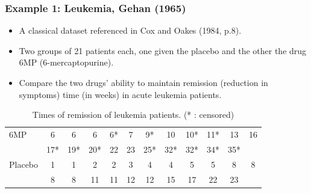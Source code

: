 \documentclass{beamer}
\newenvironment{wideitemize}%
  {\begin{itemize}%
    \setlength{\parskip}{1em}}%
  {\end{itemize}}
\begin{document}
\begin{frame} \frametitle{Example 1: Leukemia, Gehan (1965)}


  
  \begin{wideitemize}
  \item A classical dataset referenced in Cox and Oakes (1984, p.8).
  
  \item Two groups of 21 patients each, one given
  the placebo and the other the drug 6MP (6-mercaptopurine).
  
  \item Compare the two drugs' ability to maintain
  remission (reduction in symptoms) time (in weeks) in acute leukemia patients.
  
  \end{wideitemize}

\begin{scriptsize}
\begin{table}
\begin{center}
\caption{Times of remission of leukemia patients. (* : censored)} \vspace{0.15cm}
  \begin{tabular}{l*{11}{c}} 6MP & 6 & 6 & 6 & 6* & 7 & 9* & 10 & 10*
    & 11* & 13 & 16\\ & 17* & 19* & 20* & 22 & 23 & 25* & 32* & 32* &
    34* & 35*\\ Placebo & 1 & 1 & 2 & 2 & 3 & 4 & 4 & 5 & 5 & 8 & 8\\
    & 8 & 8 & 11 & 11 & 12 & 12 & 15 & 17 & 22 & 23 \end{tabular}
\end{center}
\end{table}
\end{scriptsize}

\end{frame}
\end{document}
